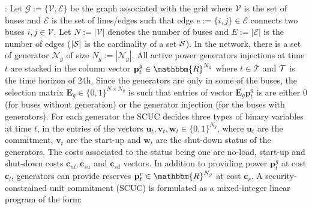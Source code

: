 \documentclass[11pt]{exam}
\begin{document}
\begin{questions}
: Let $\mathcal{G} := \{\mathcal{V},\mathcal{E}\}$ be the graph associated with the grid where $\mathcal{V}$ is the set of buses and $\mathcal{E}$ is the set of lines/edges such that edge $e := \{i,j\} \in \mathcal{E}$ connects two buses $i,j \in \mathcal{V}$. Let $N := |\mathcal{V}|$ denotes the number of buses and $E := |\mathcal{E}|$ is the number of edges  ($|{\cal S}|$ is the cardinality of a set ${\cal S}$). In the network, there is a set of generator $\mathcal{N}_g$ of size $N_g := |\mathcal{N}_g|$.  All active power generators injections at time $t$ are stacked in the column vector $\mathbf{p}^g_t \in \mathbbm{R}^{N_g}$ where $t \in \mathcal{T}$ and ${\cal T}$ is the time horizon of 24h.  Since the generators are only in some of the buses, the selection matrix $\mathbf{E}_g \in \{0,1\}^{N\times N_g}$ is such that entries of vector $\mathbf{E}_g \mathbf{p}^g_t$ is are either 0 (for buses without generation) or the  generator injection (for the buses with generators). For each generator the SCUC decides three types of binary variables at time $t$, in the entries of the vectors $\mathbf{u}_t, \mathbf{v}_t, \mathbf{w}_t \in \{0,1\}^{N_g}$, where $\mathbf{u}_t$ are the commitment, $\mathbf{v}_t$  are the start-up and $\mathbf{w}_t$ are the shut-down status of the generators. The costs associated to the status being one are no-load, start-up and shut-down costs $\mathbf{c}_{nl},\mathbf{c}_{su}$ and $\mathbf{c}_{sd}$ vectors. In addition to providing power $\mathbf{p}^g_t$ at cost $\mathbf{c}_l$, generators can provide reserves $\mathbf{p}^r_t \in \mathbbm{R}^{N_g}$ at cost $\mathbf{c}_{r}$. A security-constrained unit commitment (SCUC) is formulated as a mixed-integer linear program of the form:


\end{questions}
\end{document}
